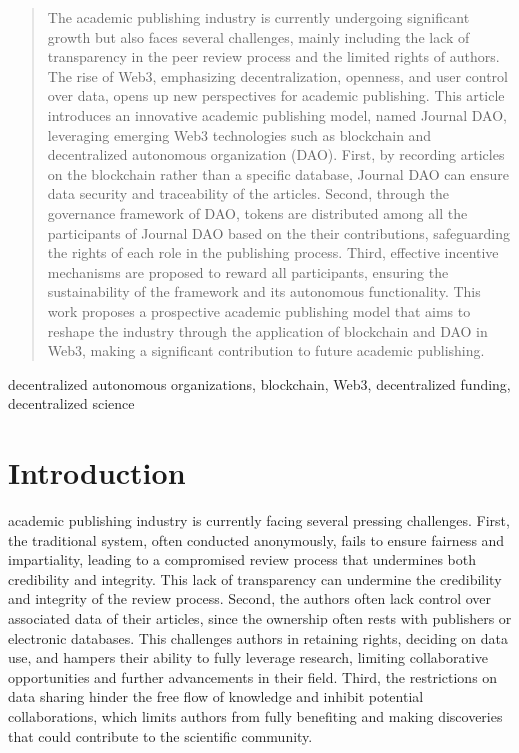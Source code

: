 \documentclass[lettersize,journal]{IEEEtran}
\begin{document}
\begin{abstract}

The academic publishing industry is currently undergoing significant growth but also faces several challenges, mainly including the lack of transparency in the peer review process and the limited rights of authors. The rise of Web3, emphasizing decentralization, openness, and user control over data, opens up new perspectives for academic publishing. This article introduces an innovative academic publishing model, named Journal DAO, leveraging emerging Web3 technologies such as blockchain and decentralized autonomous organization (DAO). First, by recording articles on the blockchain rather than a specific database, Journal DAO can ensure data security and traceability of the articles. Second, through the governance framework of DAO, tokens are distributed among all the participants of Journal DAO based on the their contributions, safeguarding the rights of each role in the publishing process. Third, effective incentive mechanisms are proposed to reward all participants, ensuring the sustainability of the framework and its autonomous functionality. This work proposes a prospective academic publishing model that aims to reshape the industry through the application of blockchain and DAO in Web3, making a significant contribution to future academic publishing.


\end{abstract}


\begin{IEEEkeywords}
decentralized autonomous organizations, blockchain, Web3, decentralized funding, decentralized science
\end{IEEEkeywords}

\section{Introduction \label{sec:introduction}}


 academic publishing industry is currently facing several pressing challenges. First, the traditional system, often conducted anonymously, fails to ensure fairness and impartiality, leading to a compromised review process that undermines both credibility and integrity. This lack of transparency can undermine the credibility and integrity of the review process. Second,
the authors often lack control over associated data of their articles, since the ownership often rests with publishers or electronic databases. This challenges authors in retaining rights, deciding on data use, and hampers their ability to fully leverage research, limiting collaborative opportunities and further advancements in their field. Third, the restrictions on data sharing hinder the free flow of knowledge and inhibit potential collaborations, which limits authors from fully benefiting and making discoveries that could contribute to the scientific community.
\end{document}
